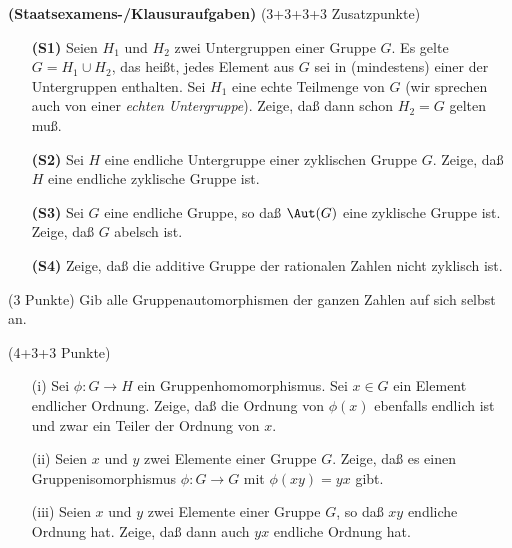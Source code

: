 \documentclass{algsheet}
\author{Dipl.-Math.~Franz Vogler}
\date{02.~Mai 2011}
\begin{document}
                \maketitle



\begin{exercise}\textbf{(Staatsexamens-/Klausuraufgaben)} (3+3+3+3 Zusatzpunkte)
\vspace{-1ex}
\begin{itemize}
    \item [\textbf{(S1)}]Seien \(H_1\) und \(H_2\) zwei Untergruppen einer Gruppe \(G\). Es gelte
    \(G = H_1 \cup H_2\), das heißt, jedes Element aus \(G\) sei in (mindestens)
    einer der Untergruppen enthalten. Sei \(H_1\) eine echte Teilmenge von \(G\)
    (wir sprechen auch von einer \emph{echten Untergruppe}). Zeige, daß dann schon
    \(H_2 = G\) gelten muß.

    \item [\textbf{(S2)}]  Sei \(H\) eine endliche Untergruppe einer zyklischen Gruppe \(G\). Zeige,
    daß \(H\) eine endliche zyklische Gruppe ist.
    \item [\textbf{(S3)}] Sei \(G\) eine endliche Gruppe, so daß \(\Aut(G)\) eine zyklische Gruppe ist.
    Zeige, daß \(G\) abelsch ist.
    \item [\textbf{(S4)}]  Zeige, daß die additive Gruppe der rationalen Zahlen nicht zyklisch ist.
\end{itemize}
\end{exercise}




\begin{exercise}(3 Punkte)\newline
    Gib alle Gruppenautomorphismen der ganzen Zahlen auf sich selbst an.
\end{exercise}



\begin{exercise}(4+3+3 Punkte)\vspace{-1ex}
 \begin{itemize}
    \item [(i)] Sei \(\phi\colon G \to H\) ein Gruppenhomomorphismus. Sei \(x \in G\) ein
    Element endlicher Ordnung. Zeige, daß die Ordnung von \(\phi(x)\) ebenfalls
    endlich ist und zwar ein Teiler der Ordnung von \(x\).
 \item [(ii)] Seien \(x\) und \(y\) zwei Elemente einer Gruppe \(G\). Zeige, daß es
    einen Gruppenisomorphismus \(\phi\colon G \to G\) mit \(\phi(xy) = y x\)
    gibt.
 \item [(iii)] Seien \(x\) und \(y\) zwei Elemente einer Gruppe \(G\), so daß \(x y\)
    endliche Ordnung hat. Zeige, daß dann auch \(y x\) endliche Ordnung hat.
\end{itemize}
\end{exercise}
\end{document}
